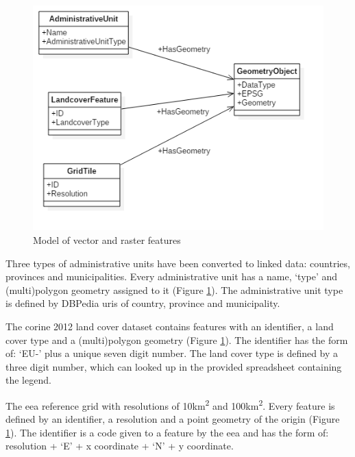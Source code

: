 \begin{figure}
	\includegraphics[width=0.7\linewidth]{UML/staticdata2.PNG}
	\caption{Model of vector and raster features}
	\label{fig:Static}
\end{figure}

Three types of administrative units have been converted to linked data: countries, provinces and municipalities. Every administrative unit has a name, `type' and (multi)polygon geometry assigned to it (Figure \ref{fig:Static}). The administrative unit type is defined by DBPedia \ac{uri}s of country, province and municipality. 

The \ac{corine} 2012 land cover dataset contains features with an identifier, a land cover type and a (multi)polygon geometry (Figure \ref{fig:Static}). The identifier has the form of: `EU-' plus a unique seven digit number. The land cover type is defined by a three digit number, which can looked up in the provided spreadsheet containing the legend.    

The \ac{eea} reference grid with resolutions of 10km\textsuperscript{2} and 100km\textsuperscript{2}. Every feature is defined by an identifier, a resolution and a point geometry of the origin (Figure \ref{fig:Static}). The identifier is a code given to a feature by the \ac{eea} and has the form of: resolution + `E' + x coordinate + `N' + y coordinate.  
